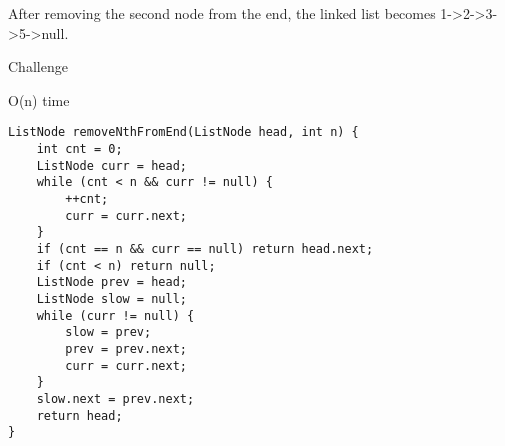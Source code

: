 \documentclass[9pt, b5paaper]{book}
\begin{document}
After removing the second node from the end, the linked list becomes 1->2->3->5->null.

Challenge

O(n) time
\begin{verbatim}
ListNode removeNthFromEnd(ListNode head, int n) {
    int cnt = 0;
    ListNode curr = head;
    while (cnt < n && curr != null) {
        ++cnt;
        curr = curr.next;
    }
    if (cnt == n && curr == null) return head.next;
    if (cnt < n) return null;
    ListNode prev = head;
    ListNode slow = null;
    while (curr != null) {
        slow = prev;
        prev = prev.next;
        curr = curr.next;
    }
    slow.next = prev.next;
    return head;
}
\end{verbatim}
\end{document}
